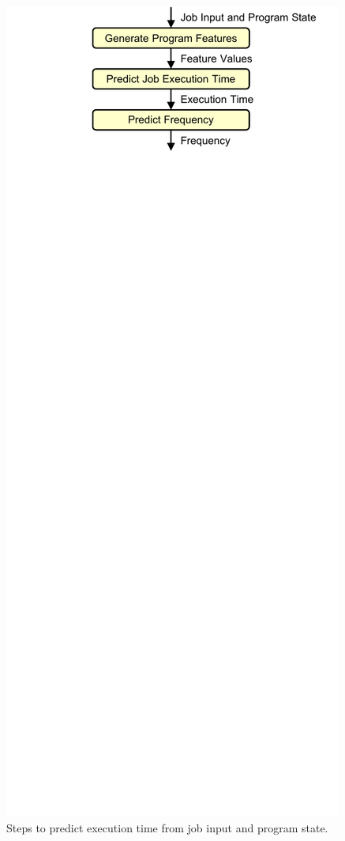 \begin{figure}
  \begin{center}
    \includegraphics{exec_time_prediction/figs/prediction_flow.pdf}
    \caption{Steps to predict execution time from job input and program state.}
    \label{fig:exec_time_prediction.prediction.prediction_flow}
  \end{center}
\end{figure}


